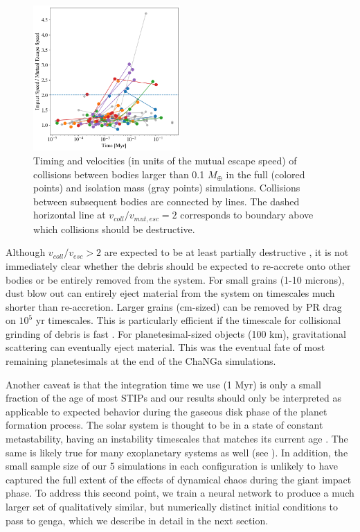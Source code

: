 \begin{figure}
\begin{center}
    \includegraphics[width=0.5\textwidth]{figures/stip/impact_iso_comp.png}
    \caption{Timing and velocities (in units of the mutual escape speed) of collisions between bodies larger than 0.1 $M_{\oplus}$ in the full (colored points) and isolation mass (gray points) simulations. Collisions between subsequent bodies are connected by lines. The dashed horizontal line at $v_{coll}/v_{mut,esc} = 2$ corresponds to boundary above which collisions should be destructive.\label{fig:impact_iso_comp}}
\end{center}
\end{figure}

Although $v_{coll}/v_{esc} > 2$ are expected to be at least partially destructive \cite{marcus09}, it is not immediately clear whether the debris should be expected to re-accrete onto other bodies or be entirely removed from the system. For small grains (1-10 microns), dust blow out can entirely eject material from the system on timescales much shorter than re-accretion. Larger grains (cm-sized) can be removed by PR drag on $10^{5}$ yr timescales. This is particularly efficient if the timescale for collisional grinding of debris is fast \cite{melis12}. For planetesimal-sized objects (100 km), gravitational scattering can eventually eject material. This was the eventual fate of most remaining planetesimals at the end of the {\sc ChaNGa} simulations.

Another caveat is that the integration time we use (1 Myr) is only a small fraction of the age of most STIPs \cite{silvaaguirre15} and our results should only be interpreted as applicable to expected behavior during the gaseous disk phase of the planet formation process. The solar system is thought to be in a state of constant metastability, having an instability timescales that matches its current age \cite{laskar96}. The same is likely true for many exoplanetary systems as well (see \cite{deck12, lissauer12, lissauer13}). In addition, the small sample size of our 5 simulations in each configuration is unlikely to have captured the full extent of the effects of dynamical chaos during the giant impact phase. To address this second point, we train a neural network to produce a much larger set of qualitatively similar, but numerically distinct initial conditions to pass to {\sc genga}, which we describe in detail in the next section.

